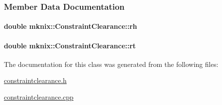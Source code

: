 \subsubsection{Member Data Documentation}
\hypertarget{classmknix_1_1_constraint_clearance_ad4bba99aa716d1f15bd9dc613f0352e8}{
\paragraph[{rh}]{\setlength{\rightskip}{0pt plus 5cm}double mknix\-::\-Constraint\-Clearance\-::rh\hspace{0.3cm}{\ttfamily [protected]}}}\label{classmknix_1_1_constraint_clearance_ad4bba99aa716d1f15bd9dc613f0352e8}
\hypertarget{classmknix_1_1_constraint_clearance_a07e6a50d3416e2265e2dadb1bf730c43}{
\paragraph[{rt}]{\setlength{\rightskip}{0pt plus 5cm}double mknix\-::\-Constraint\-Clearance\-::rt\hspace{0.3cm}{\ttfamily [protected]}}}\label{classmknix_1_1_constraint_clearance_a07e6a50d3416e2265e2dadb1bf730c43}


The documentation for this class was generated from the following files\-:\begin{DoxyCompactItemize}
\item 
\hyperlink{constraintclearance_8h}{constraintclearance.\-h}\item 
\hyperlink{constraintclearance_8cpp}{constraintclearance.\-cpp}\end{DoxyCompactItemize}
